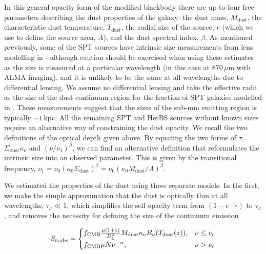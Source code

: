 In this general opacity form of the modified blackbody there are up to four free parameters describing the dust properties of the galaxy: the dust mass, $M_{\textrm{dust}}$, the characteristic dust temperature, $T_{\textrm{dust}}$, the radial size of the source, $r$ (which we use to define the source area, $A$), and the dust spectral index, $\beta$. As mentioned previously, some of the SPT sources have intrinsic size measurements from lens modelling in \citealt{Spilker_2016} - although caution should be exercised when using these estimates as the size is measured at a particular wavelength (in this case at $870\,\mu$m with ALMA imaging), and it is unlikely to be the same at all wavelengths due to differential lensing. We assume no differential lensing and take the effective radii as the size of the dust continuum region for the fraction of SPT galaxies modelled in \citealt{Spilker_2016}. These measurements suggest that the sizes of the sub-mm emitting region is typically $\sim 1\,$kpc. All the remaining SPT and HerBS sources without known sizes require an alternative way of constraining the dust opacity. We recall the two definitions of the optical depth given above. By equating the two forms of $\tau$, $\Sigma_{\textrm{dust}}\kappa_\nu$  and $(\nu/\nu_1)^\beta$, we can find an alternative definition that reformulates the intrinsic size into an observed parameter. This is given by the transitional frequency, $\nu_1 = \nu_0 (\kappa_0\Sigma_{\textrm{dust}})^\beta = \nu_0 (\kappa_0M_{\textrm{dust}}/A)^\beta$.

We estimated the properties of the dust using three separate models. In the first, we make the simple approximation that the dust is optically thin at all wavelengths, $\tau_\nu \ll 1$, which simplifies the self opacity term from $(1 - e^{-\tau_\nu})$ to $\tau_\nu$, and removes the necessity for defining the size of the continuum emission

\begin{equation}
	S_{\nu, \textrm{obs}} =  
	\begin{cases}
		f_{\textrm{CMB}}\frac{\mu (1+z)}{D_{\rm L}^2} M_{\textrm{dust}} \kappa_\nu B_\nu(T_{\textrm{dust}}(z)), & \nu \le \nu_{\rm c} \\
		f_{\textrm{CMB}}\mu N \nu^{-\alpha}, & \nu > \nu_{\rm c} \\
	\end{cases}
    \label{eq:modified_blackbody_optically_thin}
\end{equation}


